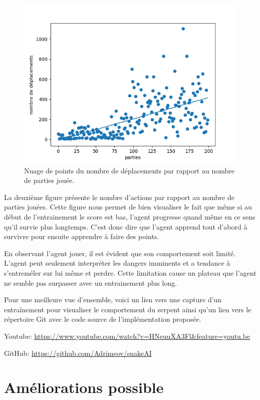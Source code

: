 \documentclass{article}
\begin{document}
\begin{figure}[ht]
	\includegraphics[width=\linewidth]{moves_per_game_200.png}
	\caption{Nuage de points du nombre de déplacements par rapport au nombre de parties jouée.}
	\label{fig:Snake}
\end{figure}

La deuxième figure présente le nombre d'actions par rapport au nombre de parties jouées. Cette figure nous permet de bien visualiser le fait que même si au début de l'entrainement le score est bas, l'agent progresse quand même en ce sens qu'il survie plus longtemps. C'est donc dire que l'agent apprend tout d'abord à survivre pour ensuite apprendre à faire des points.  

En observant l'agent jouer, il est évident que son comportement soit limité. L'agent peut seulement interpréter les dangers imminents et a tendance à s'entreméler sur lui même et perdre. Cette limitation cause un plateau que l'agent ne semble pas surpasser avec un entrainement plus long.


Pour une meilleure vue d'ensemble, voici un lien vers une capture d’un entraînement pour visualiser le comportement du serpent ainsi qu'un lien vers le répertoire Git avec le code source de l'implémentation proposée.

Youtube: 
\href{https://www.youtube.com/watch?v=HNeuuXA3Flg&feature=youtu.be}{https://www.youtube.com/watch?v=HNeuuXA3Fl\&feature=youtu.be}

GitHub: 
\href{https://github.com/Adrimeov/snakeAI}{https://github.com/Adrimeov/snakeAI}


\section{Améliorations possible}
\end{document}
